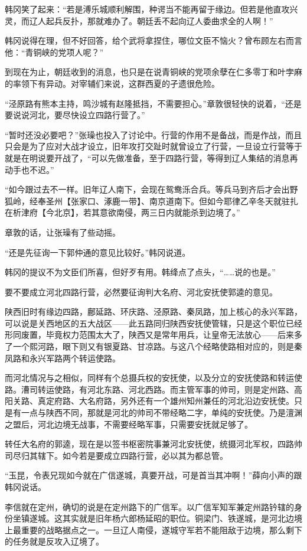 韩冈笑了起来：“若是溥乐城顺利解围，种谔当不能再留于缘边。但若是他直攻兴灵，而辽人起兵反扑，那就难办了。朝廷丢不起向辽人委曲求全的人啊！”

韩冈说得在理，但不好回答，给个武将拿捏住，哪位文臣不恼火？曾布顾左右而言他：“青铜峡的党项人呢？”

到现在为止，朝廷收到的消息，也只是在说青铜峡的党项余孽在仁多零丁和叶孛麻的率领下有异动。对宰辅们来说，这群西夏的孑遗很危险。

“泾原路有熊本主持，鸣沙城有赵隆抵挡，不需要担心。”章敦很轻快的说着，“还是要说说河北，要尽快设立四路行营了。”

“暂时还没必要吧？”张璪也投入了讨论中。行营的作用不是备战，而是作战，而且只会是为了应对大战才设立，旧年攻打交趾时就曾设立了行营，一旦设立行营等于就是在明说要开战了，“可以先做准备，至于四路行营，等得到辽人集结的消息再动手也不迟。”

“如今跟过去不一样。旧年辽人南下，会现在鸳鸯泺合兵。等兵马到齐后才会出野狐岭，经奉圣州【张家口、涿鹿一带】、南京道南下。但如今耶律乙辛冬天就驻扎在析津府【今北京】，若其意欲南侵，两三日内就能杀到边境了。”

章敦的话，让张璪有了些动摇。

“还是先征询一下郭仲通的意见比较好。”韩冈说道。

韩冈的提议不为文臣们所喜，但好歹有用。韩绛点了点头，“……说的也是。”

要不要成立河北四路行营，必然要征询判大名府、河北安抚使郭逵的意见。

陕西旧时有缘边四路，鄜延路、环庆路、泾原路、秦凤路，加上核心的永兴军路，可以说是关西地区的五大战区——此五路同归陕西安抚使管辖，只是这个职位已经形同废置，毕竟权力范围太大了，陕西又是常年用兵，让皇帝无法放心——后来多了一个熙河路，眼下则又有银夏路、甘凉路。与这八个经略使路相对应的，则是秦凤路和永兴军路两个转运使路。

而河北情况与之相似，同样有个总摄兵权的安抚使，以及分立的安抚使路和转运使路。漕司转运使路，有河北东路、河北西路。而主管军事的帅司，则是定州路、高阳关路、真定府路、大名府路，另外还有一个雄州知州兼任的河北沿边安抚使。只是有一点与陕西不同，那就是河北的帅司不带经略二字，单纯的安抚使。乃是澶渊之盟后，河北边境无战事，不需要经略军事，只需要安抚就足够了。

转任大名府的郭逵，现在是以签书枢密院事兼河北安抚使，统摄河北军权，四路帅司尽归其辖下。如今若是要成立四路行营，必以其为都总管。

“玉昆，令表兄现如今就在广信遂城，真要开战，可是首当其冲啊！”薛向小声的跟韩冈说话。

李信就在定州，确切的说是在定州路下的广信军。以广信军知军兼定州路钤辖的身份坐镇遂城。这其实就是旧年杨六郎杨延昭的职位。铜梁门、铁遂城，是河北边境上最重要的战略据点之一。一旦辽人南侵，遂城守军若不能阻敌于边境，那么剩下的任务就是反攻入辽境了。


